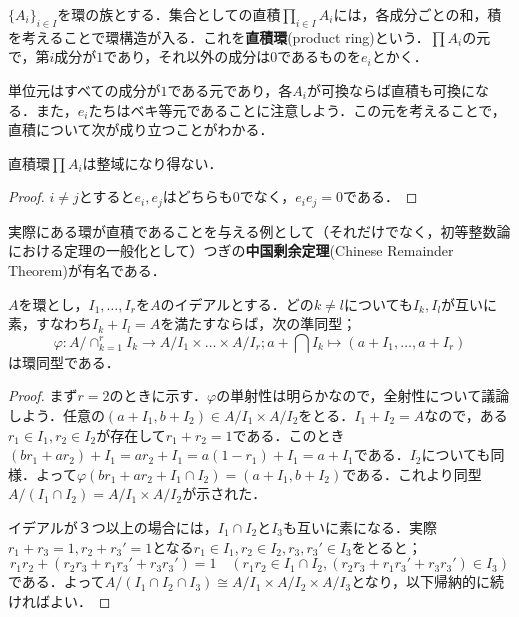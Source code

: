 \begin{defi}[直積環]
	$\{A_i\}_{i\in I}$を環の族とする．集合としての直積$\prod_{i\in I} A_i$には，各成分ごとの和，積を考えることで環構造が入る．これを\textbf{直積環}(product ring)という．$\prod A_i$の元で，第$i$成分が$1$であり，それ以外の成分は$0$であるものを$e_i$とかく．
\end{defi}

単位元はすべての成分が$1$である元であり，各$A_i$が可換ならば直積も可換になる．また，$e_i$たちはベキ等元であることに注意しよう．この元を考えることで，直積について次が成り立つことがわかる．

\begin{prop}
	直積環$\prod A_i$は整域になり得ない．
\end{prop}

\begin{proof}
	$i\neq j$とすると$e_i,e_j$はどちらも0でなく，$e_ie_j=0$である．
\end{proof}

実際にある環が直積であることを与える例として（それだけでなく，初等整数論における定理の一般化として）つぎの\textbf{中国剰余定理}(Chinese Remainder Theorem)が有名である．

\begin{thm}[中国剰余定理]\label{thm:中国剰余定理}
	$A$を環とし，$I_1,\dots,I_r$を$A$のイデアルとする．どの$k\neq l$についても$I_k,I_l$が互いに素，すなわち$I_k+I_l=A$を満たすならば，次の準同型；
	\[\varphi:A/\cap_{k=1}^rI_k\to A/I_1\times\dots\times A/I_r;a+\bigcap I_k\mapsto (a+I_1,\dots,a+I_r)\]
	は環同型である．
\end{thm}

\begin{proof}
	まず$r=2$のときに示す．$\varphi$の単射性は明らかなので，全射性について議論しよう．任意の$(a+I_1,b+I_2)\in A/I_1\times A/I_2$をとる．$I_1+I_2=A$なので，ある$r_1\in I_1,r_2\in I_2$が存在して$r_1+r_2=1$である．このとき$(br_1+ar_2)+I_1=ar_2+I_1=a(1-r_1)+I_1=a+I_1$である．$I_2$についても同様．よって$\varphi(br_1+ar_2+I_1\cap I_2)=(a+I_1,b+I_2)$である．これより同型$A/(I_1\cap I_2)=A/I_1\times A/I_2$が示された．
	
	イデアルが３つ以上の場合には，$I_1\cap I_2$と$I_3$も互いに素になる．実際$r_1+r_3=1,r_2+r_3'=1$となる$r_1\in I_1,r_2\in I_2,r_3,r_3'\in I_3$をとると；
	\[r_1r_2+(r_2r_3+r_1r_3'+r_3r_3')=1\quad(r_1r_2\in I_1\cap I_2, (r_2r_3+r_1r_3'+r_3r_3')\in I_3)\]
	である．よって$A/(I_1\cap I_2\cap I_3)\cong A/I_1\times A/I_2\times A/I_3$となり，以下帰納的に続ければよい．
\end{proof}

